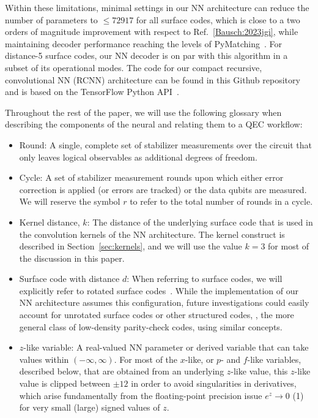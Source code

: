 Within these limitations, minimal settings in our NN architecture can reduce the number of parameters to $\leq 72917$ for all surface codes, which is close to a two orders of magnitude improvement with respect to Ref.~\ref{Bausch:2023jgi}, while maintaining decoder performance reaching the levels of PyMatching~\cite{Higgott:2023}. For distance-5 surface codes, our NN decoder is on par with this algorithm in a subset of its operational modes. The code for our compact recursive, convolutional NN (RCNN) architecture can be found in this Github repository~\cite{ourcode} and is based on the TensorFlow Python API~\cite{tensorflow,tensorflow2}.

Throughout the rest of the paper, we will use the following glossary when describing the components of the neural and relating them to a QEC workflow:
\begin{itemize}
\item Round: A single, complete set of stabilizer measurements over the circuit that only leaves logical observables as additional degrees of freedom.
\item Cycle: A set of stabilizer measurement rounds upon which either error correction is applied (or errors are tracked) or the data qubits are measured. We will reserve the symbol $r$ to refer to the total number of rounds in a cycle.
\item Kernel distance, $k$: The distance of the underlying surface code that is used in the convolution kernels of the NN architecture. The kernel construct is described in Section~\ref{sec:kernels}, and we will use the value $k=3$ for most of the discussion in this paper.
\item Surface code with distance $d$: When referring to surface codes, we will explicitly refer to rotated surface codes~\cite{Bombin:2007}. While the implementation of our NN architecture assumes this configuration, future investigations could easily account for unrotated surface codes or other structured codes, \eg, the more general class of low-density parity-check codes, using similar concepts.
\item $z$-like variable: A real-valued NN parameter or derived variable that can take values within $(-\infty, \infty)$. For most of the $x$-like, or $p$- and $f$-like variables, described below, that are obtained from an underlying $z$-like value, this $z$-like value is clipped between $\pm12$ in order to avoid singularities in derivatives, which arise fundamentally from the floating-point precision issue $e^z \to 0$ (1) for very small (large) signed values of $z$.

\end{itemize}
